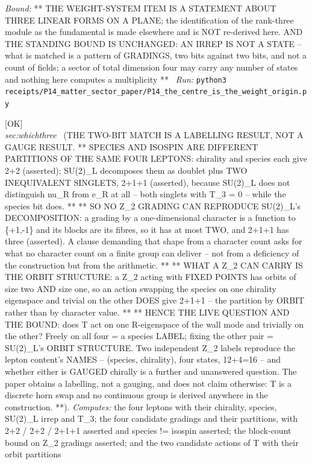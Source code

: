\begin{description}
 \emph{Bound:} ** THE WEIGHT-SYSTEM ITEM IS A STATEMENT ABOUT THREE LINEAR FORMS ON A PLANE; the identification of the rank-three module as the fundamental is made elsewhere and is NOT re-derived here. AND THE STANDING BOUND IS UNCHANGED: AN IRREP IS NOT A STATE -- what is matched is a pattern of GRADINGS, two bits against two bits, and not a count of fields; a sector of total dimension four may carry any number of states and nothing here computes a multiplicity **
\ \emph{Run:} \texttt{python3 receipts/P14\_matter\_sector\_paper/P14\_the\_centre\_is\_the\_weight\_origin.py}
\item[\rcptlabel{P14_a_labelling_not_a_gauging}{P14R39}\textbf{P14R39}\quad\texttt{P14\_a\_labelling\_not\_a\_gauging}]\hfill\textsf{[OK]}\\
\textit{sec:whichthree} \ (THE TWO-BIT MATCH IS A LABELLING RESULT, NOT A GAUGE RESULT. ** SPECIES AND ISOSPIN ARE DIFFERENT PARTITIONS OF THE SAME FOUR LEPTONS: chirality and species each give 2+2 (asserted); SU(2)\_L decomposes them as doublet plus TWO INEQUIVALENT SINGLETS, 2+1+1 (asserted), because SU(2)\_L does not distinguish nu\_R from e\_R at all -- both singlets with T\_3 = 0 -- while the species bit does. ** ** SO NO Z\_2 GRADING CAN REPRODUCE SU(2)\_L's DECOMPOSITION: a grading by a one-dimensional character is a function to \{+1,-1\} and its blocks are its fibres, so it has at most TWO, and 2+1+1 has three (asserted). A clause demanding that shape from a character count asks for what no character count on a finite group can deliver -- not from a deficiency of the construction but from the arithmetic. ** ** WHAT A Z\_2 CAN CARRY IS THE ORBIT STRUCTURE: a Z\_2 acting with FIXED POINTS has orbits of size two AND size one, so an action swapping the species on one chirality eigenspace and trivial on the other DOES give 2+1+1 -- the partition by ORBIT rather than by character value. ** ** HENCE THE LIVE QUESTION AND THE BOUND: does T act on one R-eigenspace of the wall mode and trivially on the other? Freely on all four = a species LABEL; fixing the other pair = SU(2)\_L's ORBIT STRUCTURE. Two independent Z\_2 labels reproduce the lepton content's NAMES -- (species, chirality), four states, 12+4=16 -- and whether either is GAUGED chirally is a further and unanswered question. The paper obtains a labelling, not a gauging, and does not claim otherwise: T is a discrete horn swap and no continuous group is derived anywhere in the construction. **). 
\emph{Computes:} the four leptons with their chirality, species, SU(2)\_L irrep and T\_3; the four candidate gradings and their partitions, with 2+2 / 2+2 / 2+1+1 asserted and species != isospin asserted; the block-count bound on Z\_2 gradings asserted; and the two candidate actions of T with their orbit partitions

\end{description}
